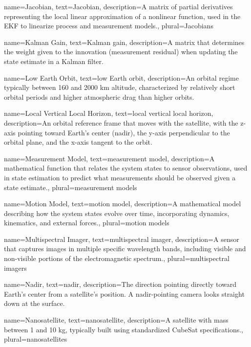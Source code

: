 {
	name=Jacobian,
	text=Jacobian,
	description={A matrix of partial derivatives representing the local linear approximation of a nonlinear function, used in the EKF to linearize process and measurement models.},
	plural=Jacobians
}

{
	name=Kalman Gain,
	text=Kalman gain,
	description={A matrix that determines the weight given to the innovation (measurement residual) when updating the state estimate in a Kalman filter.}
}

{
	name=Low Earth Orbit,
	text=low Earth orbit,
	description={An orbital regime typically between 160 and 2000 km altitude, characterized by relatively short orbital periods and higher atmospheric drag than higher orbits.}
}

{
	name=Local Vertical Local Horizon,
	text=local vertical local horizon,
	description={An orbital reference frame that moves with the satellite, with the z-axis pointing toward Earth's center (nadir), the y-axis perpendicular to the orbital plane, and the x-axis tangent to the orbit.}
}

{
	name=Measurement Model,
	text=measurement model,
	description={A mathematical function that relates the system states to sensor observations, used in state estimation to predict what measurements should be observed given a state estimate.},
	plural=measurement models
}

{
	name=Motion Model,
	text=motion model,
	description={A mathematical model describing how the system states evolve over time, incorporating dynamics, kinematics, and external forces.},
	plural=motion models
}

{
	name=Multispectral Imager,
	text=multispectral imager,
	description={A sensor that captures images in multiple specific wavelength bands, including visible and non-visible portions of the electromagnetic spectrum.},
	plural=multispectral imagers
}

{
	name=Nadir,
	text=nadir,
	description={The direction pointing directly toward Earth's center from a satellite's position. A nadir-pointing camera looks straight down at the surface.}
}

{
	name=Nanosatellite,
	text=nanosatellite,
	description={A satellite with mass between 1 and 10 kg, typically built using standardized CubeSat specifications.},
	plural=nanosatellites
}

